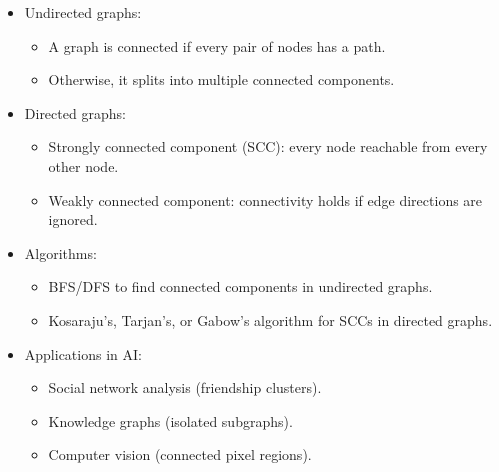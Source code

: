 \documentclass[
  letterpaper,
  DIV=11,
  numbers=noendperiod]{scrreprt}
\providecommand{\tightlist}{%
  \setlength{\itemsep}{0pt}\setlength{\parskip}{0pt}}
\begin{document}
\begin{itemize}
\item
  Undirected graphs:

  \begin{itemize}
  \tightlist
  \item
    A graph is connected if every pair of nodes has a path.
  \item
    Otherwise, it splits into multiple connected components.
  \end{itemize}
\item
  Directed graphs:

  \begin{itemize}
  \tightlist
  \item
    Strongly connected component (SCC): every node reachable from every
    other node.
  \item
    Weakly connected component: connectivity holds if edge directions
    are ignored.
  \end{itemize}
\item
  Algorithms:

  \begin{itemize}
  \tightlist
  \item
    BFS/DFS to find connected components in undirected graphs.
  \item
    Kosaraju's, Tarjan's, or Gabow's algorithm for SCCs in directed
    graphs.
  \end{itemize}
\item
  Applications in AI:

  \begin{itemize}
  \tightlist
  \item
    Social network analysis (friendship clusters).
  \item
    Knowledge graphs (isolated subgraphs).
  \item
    Computer vision (connected pixel regions).
  \end{itemize}
\end{itemize}
\end{document}
